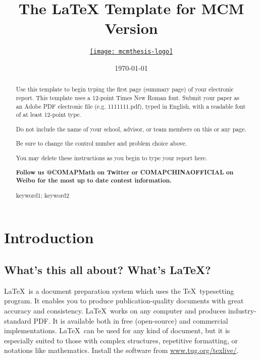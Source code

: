 \documentclass{mcmthesis}
\title{The \LaTeX{} Template for MCM Version \MCMversion}
\author{\small \href{https://www.latexstudio.net/}
  {\texttt{[image: mcmthesis-logo]}}}
\date{\today}
\begin{document}
\begin{abstract}
\par Use this template to begin typing the first page (summary page) of your electronic report. This
template uses a 12-point Times New Roman font. Submit your paper as an Adobe PDF
electronic file (e.g. 1111111.pdf), typed in English, with a readable font of at least 12-point type. 

Do not include the name of your school, advisor, or team members on this or any page. 

Be sure to change the control number and problem choice above. 

You may delete these instructions as you begin to type your report here.  

\textbf{Follow us @COMAPMath on Twitter or COMAPCHINAOFFICIAL on Weibo for the
most up to date contest information.}

\begin{keywords}
keyword1; keyword2
\end{keywords}
\end{abstract}
\maketitle
\tableofcontents
\newpage
\section{Introduction}
\subsection{What's this all about? What's \LaTeX?}
\LaTeX\ is a document preparation system which uses the \TeX\
typesetting program. It enables you to produce
publication-quality documents with great accuracy and
consistency. \LaTeX\ works on any computer and produces
industry-standard PDF. It is available both in free (open-source)
and commercial implementations. \LaTeX\ can be used for any kind
of document, but it is especially suited to those with complex
structures, repetitive formatting, or notations like
mathematics. Install the software from
\url{www.tug.org/texlive/}.
\end{document}
